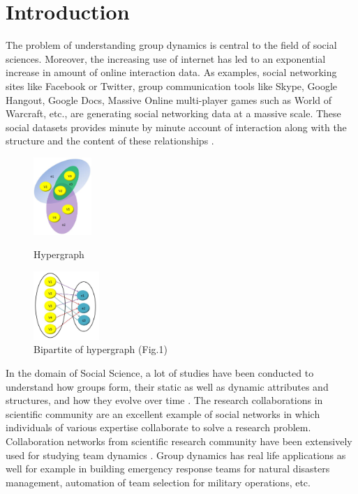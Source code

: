 \documentclass{sig-alternate}
\begin{document}


\section{Introduction}

The problem of understanding group dynamics is central to the field of social sciences. Moreover, the increasing use of internet has led to an exponential increase in amount of online interaction data. As examples, social networking sites like Facebook or Twitter, group communication tools like Skype, Google Hangout, Google Docs, Massive Online multi-player games such as World of Warcraft, etc., are generating social networking data at a massive scale. These social datasets provides minute by minute account of interaction along with the structure and the content of these relationships \cite{Vázquez28122004}. 

\begin{figure}[ht]
\begin{minipage}[b]{0.40\linewidth}
\centering
\includegraphics[width=22mm]{hypergraph.JPG}
\caption{Hypergraph}
\label{fig:figure1}
\end{minipage}
\hspace{0.5cm}
\begin{minipage}[b]{0.40\linewidth}
\centering
\includegraphics[width=25mm]{bipartite.JPG}
\caption{Bipartite of hypergraph (Fig.1)}
\label{fig:figure2}
\end{minipage}
\vspace{-1.1em}
\end{figure}

In the domain of Social Science, a lot of studies have been conducted to understand how groups form, their static as well as dynamic attributes and structures, and how they evolve over time \cite{coleman1988social}. The research collaborations in scientific community are an excellent example of social networks in which individuals of various expertise collaborate to solve a research problem. Collaboration networks from scientific research community have been extensively used for studying team dynamics \cite{katz1997research}\cite{newman2001structure}\cite{barabasi2002evolution}. Group dynamics has real life applications as well for example in building emergency response teams for natural disasters management, automation of team selection for military operations, etc. 
\end{document}
